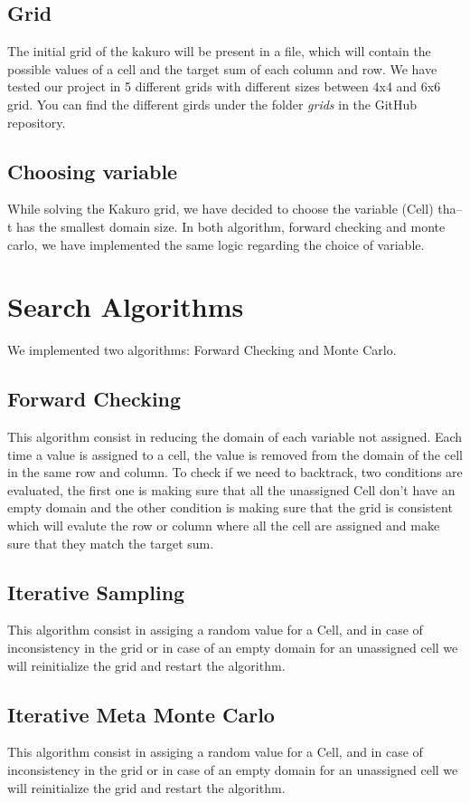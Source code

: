 \documentclass[journal, a4paper]{IEEEtran}
\begin{document}
\subsection{Grid}
The initial grid of the kakuro will be present in a file, which will contain the possible values of a cell and the target sum of each column and row. We have tested our project in 5 different grids with different sizes between 4x4 and 6x6 grid. You can find the different girds under the folder \textit{grids} in the GitHub repository.

\subsection{Choosing variable}
While solving the Kakuro grid, we have decided to choose the variable (Cell) tha--t has the smallest domain size. In both algorithm, forward checking and monte carlo, we have implemented the same logic regarding the choice of variable.

\section{Search Algorithms}
We implemented two algorithms: Forward Checking and Monte Carlo.
\subsection{Forward Checking}
This algorithm consist in reducing the domain of each variable not assigned. Each time a value is assigned to a cell, the value is removed from the domain of the cell in the same row and column. To check if we need to backtrack, two conditions are evaluated, the first one is making sure that all the unassigned Cell don't have an empty domain and the other condition is making sure that the grid is consistent which will evalute the row or column where all the cell are assigned and make sure that they match the target sum.

\subsection{Iterative Sampling}
This algorithm consist in assiging a random value for a Cell, and in case of inconsistency in the grid or in case of an empty domain for an unassigned cell we will reinitialize the grid and restart the algorithm. 

\subsection{Iterative Meta Monte Carlo}
This algorithm consist in assiging a random value for a Cell, and in case of inconsistency in the grid or in case of an empty domain for an unassigned cell we will reinitialize the grid and restart the algorithm. 
\end{document}
